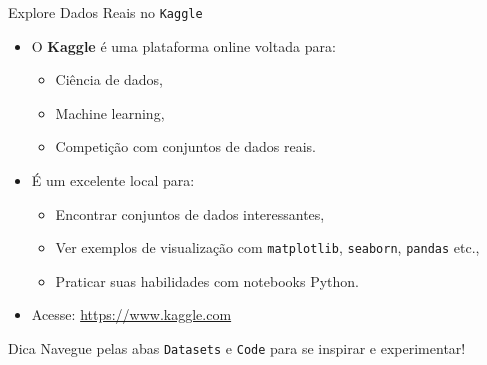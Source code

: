 \begin{frame}{Explore Dados Reais no \texttt{Kaggle}}
    \begin{itemize}
        \item O \textbf{Kaggle} é uma plataforma online voltada para:
              \begin{itemize}
                  \item Ciência de dados,
                  \item Machine learning,
                  \item Competição com conjuntos de dados reais.
              \end{itemize}

        \item É um excelente local para:
              \begin{itemize}
                  \item Encontrar conjuntos de dados interessantes,
                  \item Ver exemplos de visualização com \texttt{matplotlib}, \texttt{seaborn}, \texttt{pandas} etc.,
                  \item Praticar suas habilidades com notebooks Python.
              \end{itemize}

        \item Acesse: \url{https://www.kaggle.com}
    \end{itemize}

    \vspace{1em}
    \begin{alertblock}{Dica}
        Navegue pelas abas \texttt{Datasets} e \texttt{Code} para se inspirar e experimentar!
    \end{alertblock}
\end{frame}


